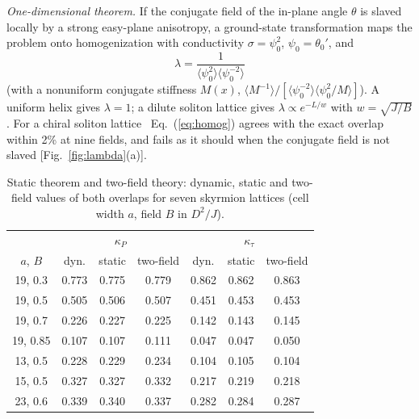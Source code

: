\documentclass[prb,reprint,amsmath,amssymb,superscriptaddress,floatfix]{revtex4-2}
\newcommand{\kP}{\kappa_P}
\newcommand{\kt}{\kappa_\tau}
\begin{document}
\textit{One-dimensional theorem.} If the conjugate field of the in-plane angle $\theta$ is slaved locally by a strong easy-plane anisotropy, a ground-state transformation maps the problem onto homogenization with conductivity $\sigma=\psi_0^2$, $\psi_0=\theta_0'$, and
\begin{equation}
\lambda=\frac{1}{\langle\psi_0^2\rangle\langle\psi_0^{-2}\rangle}
\label{eq:homog}
\end{equation}
(with a nonuniform conjugate stiffness $M(x)$, $\langle M^{-1}\rangle/[\langle\psi_0^{-2}\rangle\langle\psi_0^2/M\rangle]$). A uniform helix gives $\lambda=1$; a dilute soliton lattice gives $\lambda\propto e^{-L/w}$ with $w=\sqrt{J/B}$. For a chiral soliton lattice~\cite{Kishine2015} Eq.~(\ref{eq:homog}) agrees with the exact overlap within 2\% at nine fields, and fails as it should when the conjugate field is not slaved [Fig.~\ref{fig:lambda}(a)].

\begin{table}[t]
\caption{\label{tab:static}Static theorem and two-field theory: dynamic, static and two-field values of both overlaps for seven skyrmion lattices (cell width $a$, field $B$ in $D^2/J$).}
\begin{ruledtabular}
\begin{tabular}{ccccccc}
 & \multicolumn{3}{c}{$\kP$} & \multicolumn{3}{c}{$\kt$}\\
$a$, $B$ & dyn. & static & two-field & dyn. & static & two-field\\
\hline
19, 0.3 & 0.773 & 0.775 & 0.779 & 0.862 & 0.862 & 0.863\\
19, 0.5 & 0.505 & 0.506 & 0.507 & 0.451 & 0.453 & 0.453\\
19, 0.7 & 0.226 & 0.227 & 0.225 & 0.142 & 0.143 & 0.145\\
19, 0.85 & 0.107 & 0.107 & 0.111 & 0.047 & 0.047 & 0.050\\
13, 0.5 & 0.228 & 0.229 & 0.234 & 0.104 & 0.105 & 0.104\\
15, 0.5 & 0.327 & 0.327 & 0.332 & 0.217 & 0.219 & 0.218\\
23, 0.6 & 0.339 & 0.340 & 0.337 & 0.282 & 0.284 & 0.287\\
\end{tabular}
\end{ruledtabular}
\end{table}
\end{document}
